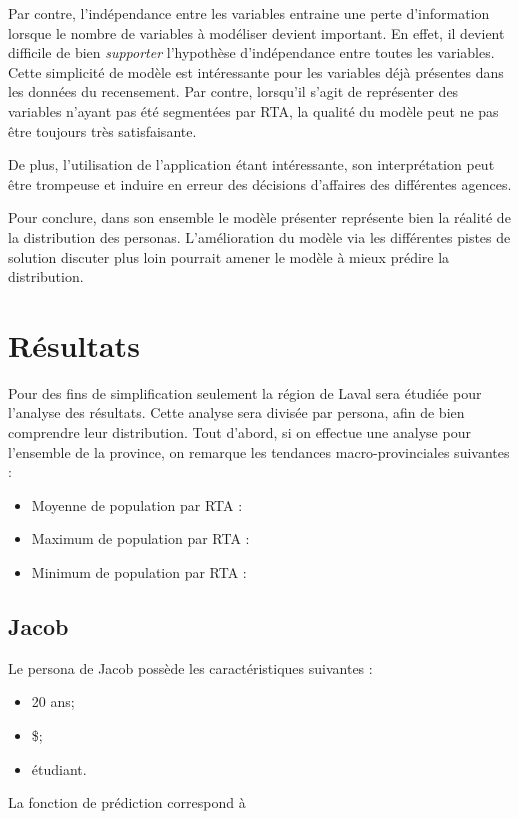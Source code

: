 \documentclass[11pt,french]{article}\usepackage[]{graphicx}\usepackage[]{color}
\begin{document}
Par contre, l'indépendance entre les variables entraine une perte d'information lorsque le nombre de variables à modéliser devient important. En effet, il devient difficile de bien \emph{supporter} l'hypothèse d'indépendance entre toutes les variables. Cette simplicité de modèle est intéressante pour les variables déjà présentes dans les données du recensement. Par contre, lorsqu'il s'agit de représenter des variables n'ayant pas été segmentées par RTA, la qualité du modèle peut ne pas être toujours très satisfaisante.
\newline

De plus, l'utilisation de l'application étant intéressante, son interprétation peut être trompeuse et induire en erreur des décisions d'affaires des différentes agences.

Pour conclure, dans son ensemble le modèle présenter représente bien la réalité de la distribution des personas. L'amélioration du modèle via les différentes pistes de solution discuter plus loin pourrait amener le modèle à mieux prédire la distribution.
 
\section{Résultats}

Pour des fins de simplification seulement la région de Laval sera étudiée pour l'analyse des résultats. Cette analyse sera divisée par persona, afin de bien comprendre leur distribution.
Tout d'abord, si on effectue une analyse pour l'ensemble de la province, on remarque les tendances macro-provinciales suivantes : 
\bigskip

\begin{itemize}
\item Moyenne de population par RTA : 
\item Maximum de population par RTA : 
\item Minimum de population par RTA : 
\end{itemize}


\subsection*{Jacob}
Le persona de Jacob possède les caractéristiques suivantes : 
\begin{itemize}
\item 20 ans;
\item{} \$;
\item étudiant.
\end{itemize}
La fonction de prédiction correspond à
\end{document}
